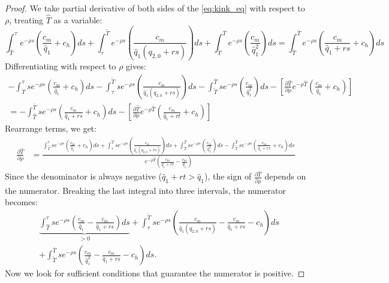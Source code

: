\documentclass{article}
\theoremstyle{plain}
\theoremstyle{plain}
\begin{document}
\begin{proof}
We take partial derivative of both sides of the \ref{eq:kink_eq} with respect to $\rho$, treating $\hat{T}$ as a variable:
\[
\int_{\hat{T}}^{\tau}e^{-\rho s}(\frac{c_{m}}{\hat{q}_{1}}+c_{h})ds+\int_{\tau}^{\tilde{T}}e^{-\rho s}(\frac{c_{m}}{\hat{q}_{1}(q_{2,0}+rs)})ds+\int_{\tilde{T}}^{\bar{T}}e^{-\rho s}(\frac{c_{m}}{\hat{q}_{1}^{2}})ds=\int_{\hat{T}}^{\bar{T}}e^{-\rho s}(\frac{c_{m}}{\hat{q}_{1}+rs}+c_{h})ds
\]
Differentiating with respect to $\rho$ gives: 
\begin{align*}
-\int_{\hat{T}}^{\tau}se^{-\rho s}(\frac{c_{m}}{\hat{q}_{1}}+c_{h})ds 
-\int_{\tau}^{\tilde{T}}se^{-\rho s}(\frac{c_{m}}{\hat{q}_{1}(q_{2,0}+rs)})ds 
-\int_{\tilde{T}}^{\bar{T}}se^{-\rho s}(\frac{c_{m}}{\hat{q}_{1}^{2}})ds
-\left[\frac{\partial\hat{T}}{\partial\rho}e^{-\rho\hat{T}}(\frac{c_{m}}{\hat{q}_{1}}+c_{h})\right] \\ 
= -\int_{\hat{T}}^{\bar{T}}se^{-\rho s}(\frac{c_{m}}{\hat{q}_{1}+rs}+c_{h})ds
-\left[\frac{\partial\hat{T}}{\partial\rho}e^{-\rho\hat{T}}\left(\frac{c_{m}}{\hat{q}_{1}+rt}+c_{h}\right)\right] &
\end{align*}
Rearrange terms, we get: 
\begin{align*}
\frac{\partial\hat{T}}{\partial\rho} & =\frac{\int_{\hat{T}}^{\tau}se^{-\rho s}(\frac{c_{m}}{\hat{q}_{1}}+c_{h})ds+\int_{\tau}^{\tilde{T}}se^{-\rho s}(\frac{c_{m}}{\hat{q}_{1}(q_{2,0}+rs)})ds+\int_{\tilde{T}}^{\bar{T}}se^{-\rho s}(\frac{c_{m}}{\hat{q}_{1}^{2}})ds-\int_{\hat{T}}^{\bar{T}}se^{-\rho s}(\frac{c_{m}}{\hat{q}_{1}+rs}+c_{h})ds}{e^{-\rho\hat{T}}\left(\frac{c_{m}}{\hat{q}_{1}+rt}-\frac{c_{m}}{\hat{q}_{1}}\right)}
\end{align*}
Since the denominator is always negative ($\hat{q}_{1}+rt>\hat{q}_{1}$), the sign of $\frac{\partial\hat{T}}{\partial\rho}$ depends on the numerator. Breaking the last integral into three intervals, the numerator becomes:
\begin{align*}
 & \underbrace{\int_{\hat{T}}^{\tau} s e^{-\rho s} \left(\frac{c_{m}}{\hat{q}_{1}} - \frac{c_{m}}{\hat{q}_{1} + rs}\right) ds}_{>0} 
+ \int_{\tau}^{\tilde{T}} s e^{-\rho s} \left(\frac{c_{m}}{\hat{q}_{1}(q_{2,0} + rs)} - \frac{c_{m}}{\hat{q}_{1} + rs} - c_{h}\right) ds \\ 
& + \int_{\tilde{T}}^{\bar{T}} s e^{-\rho s} \left(\frac{c_{m}}{\hat{q}_{1}^{2}} - \frac{c_{m}}{\hat{q}_{1} + rs} - c_{h}\right) ds.
\end{align*}
Now we look for sufficient conditions that guarantee the numerator is positive. 

\end{proof}
\end{document}

